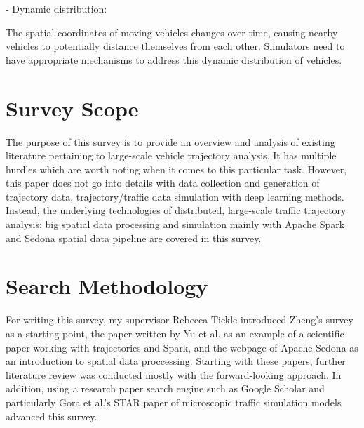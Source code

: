 \documentclass{article}
\begin{document}
- Dynamic distribution: 

The spatial coordinates of moving vehicles changes over time, causing nearby vehicles to potentially distance themselves from each other. Simulators need to have appropriate mechanisms to address this dynamic distribution of vehicles. 

\section{Survey Scope}
\label{sec:scope} %
The purpose of this survey is to provide an overview and analysis of existing literature pertaining to large-scale vehicle trajectory analysis. It has multiple hurdles which are worth noting when it comes to this particular task. However, this paper does not go into details with data collection and generation of trajectory data, trajectory/traffic data simulation with deep learning methods. Instead, the underlying technologies of distributed, large-scale traffic trajectory analysis: big spatial data processing and simulation mainly with Apache Spark and Sedona spatial data pipeline are covered in this survey.

\section{Search Methodology} 
\label{sec:methodology} %

For writing this survey, my supervisor Rebecca Tickle introduced Zheng's survey\cite{zheng2015trajectory} as a starting point, the paper written by Yu et al.\cite{yu2020dissecting} as an example of a scientific paper working with trajectories and Spark, and the webpage of Apache Sedona\cite{sedona} as an introduction to spatial data proccessing. Starting with these papers, further literature review was conducted mostly with the forward-looking approach. In addition, using a research paper search engine such as Google Scholar and particularly Gora et al.'s STAR paper of microscopic traffic simulation models\cite{gora2020microscopic} advanced this survey.
\end{document}
